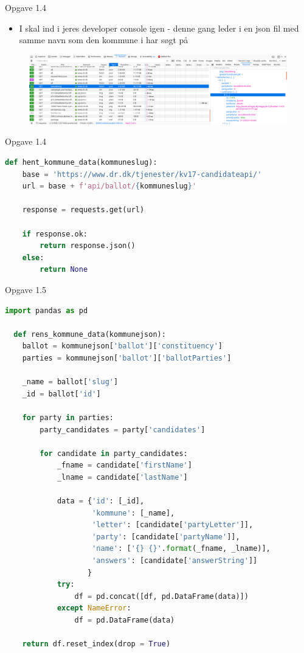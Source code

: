 \documentclass[10pt]{beamer}
\begin{document}
\begin{frame}[fragile]{Opgave 1.4}
  \begin{itemize}
    \item I skal ind i jeres developer console igen - denne gang leder i en json fil med samme navn som den kommune i har søgt på
  \end{itemize}
  \begin{figure}
    \centering
    \includegraphics[width=\textwidth]{figs/console.png}
  \end{figure}
\end{frame}

\begin{frame}[fragile]{Opgave 1.4}
  \begin{lstlisting}[language=python]
def hent_kommune_data(kommuneslug):
    base = 'https://www.dr.dk/tjenester/kv17-candidateapi/'
    url = base + f'api/ballot/{kommuneslug}'

    response = requests.get(url)

    if response.ok:
        return response.json()
    else:
        return None
  \end{lstlisting}
\end{frame}

\begin{frame}[fragile]{Opgave 1.5}
  \begin{lstlisting}[language=python, basicstyle=\tiny]
  import pandas as pd

  def rens_kommune_data(kommunejson):
    ballot = kommunejson['ballot']['constituency']
    parties = kommunejson['ballot']['ballotParties']

    _name = ballot['slug']
    _id = ballot['id']

    for party in parties:
        party_candidates = party['candidates']

        for candidate in party_candidates:
            _fname = candidate['firstName']
            _lname = candidate['lastName']

            data = {'id': [_id],
                    'kommune': [_name],
                    'letter': [candidate['partyLetter']],
                    'party': [candidate['partyName']],
                    'name': ['{} {}'.format(_fname, _lname)],
                    'answers': [candidate['answerString']]
                   }
            try:
                df = pd.concat([df, pd.DataFrame(data)])
            except NameError:
                df = pd.DataFrame(data)

    return df.reset_index(drop = True)
  \end{lstlisting}
\end{frame}
\end{document}
